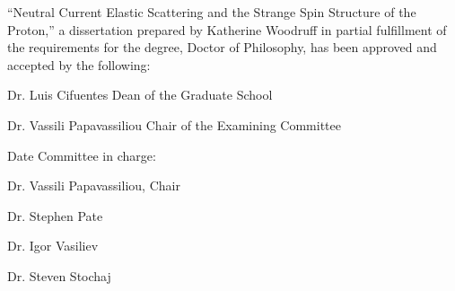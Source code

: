 \noindent
``Neutral Current Elastic Scattering and the Strange Spin Structure of the Proton,'' 
a dissertation prepared by
Katherine Woodruff 
in partial fulfillment of the requirements for the degree, 
Doctor of Philosophy,
has been approved and accepted by the following:

\setlength{\baselineskip}{\singlespace}
\vspace{0.1in}
\begin{flushleft}
\hrulefill
\newline
Dr. Luis Cifuentes
\newline
Dean of the Graduate School
\vspace{0.5in}

\hrulefill
\newline
Dr. Vassili Papavassiliou
\newline
Chair of the Examining Committee
\vspace{0.5in}

\hrulefill
\newline
Date
\vspace{0.5in}
\newline
Committee in charge:
\end{flushleft}

\setlength{\baselineskip}{\doublespace}
Dr. Vassili Papavassiliou, Chair

Dr. Stephen Pate

Dr. Igor Vasiliev

Dr. Steven Stochaj

\newpage
